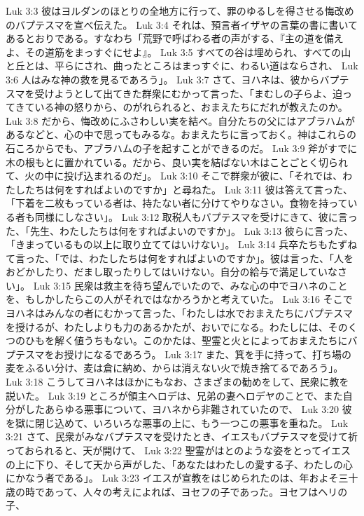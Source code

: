 Luk 3:3  彼はヨルダンのほとりの全地方に行って、罪のゆるしを得させる悔改めのバプテスマを宣べ伝えた。
Luk 3:4  それは、預言者イザヤの言葉の書に書いてあるとおりである。すなわち「荒野で呼ばわる者の声がする、『主の道を備えよ、その道筋をまっすぐにせよ』。
Luk 3:5  すべての谷は埋められ、すべての山と丘とは、平らにされ、曲ったところはまっすぐに、わるい道はならされ、
Luk 3:6  人はみな神の救を見るであろう」。
Luk 3:7  さて、ヨハネは、彼からバプテスマを受けようとして出てきた群衆にむかって言った、「まむしの子らよ、迫ってきている神の怒りから、のがれられると、おまえたちにだれが教えたのか。
Luk 3:8  だから、悔改めにふさわしい実を結べ。自分たちの父にはアブラハムがあるなどと、心の中で思ってもみるな。おまえたちに言っておく。神はこれらの石ころからでも、アブラハムの子を起すことができるのだ。
Luk 3:9  斧がすでに木の根もとに置かれている。だから、良い実を結ばない木はことごとく切られて、火の中に投げ込まれるのだ」。
Luk 3:10  そこで群衆が彼に、「それでは、わたしたちは何をすればよいのですか」と尋ねた。
Luk 3:11  彼は答えて言った、「下着を二枚もっている者は、持たない者に分けてやりなさい。食物を持っている者も同様にしなさい」。
Luk 3:12  取税人もバプテスマを受けにきて、彼に言った、「先生、わたしたちは何をすればよいのですか」。
Luk 3:13  彼らに言った、「きまっているもの以上に取り立ててはいけない」。
Luk 3:14  兵卒たちもたずねて言った、「では、わたしたちは何をすればよいのですか」。彼は言った、「人をおどかしたり、だまし取ったりしてはいけない。自分の給与で満足していなさい」。
Luk 3:15  民衆は救主を待ち望んでいたので、みな心の中でヨハネのことを、もしかしたらこの人がそれではなかろうかと考えていた。
Luk 3:16  そこでヨハネはみんなの者にむかって言った、「わたしは水でおまえたちにバプテスマを授けるが、わたしよりも力のあるかたが、おいでになる。わたしには、そのくつのひもを解く値うちもない。このかたは、聖霊と火とによっておまえたちにバプテスマをお授けになるであろう。
Luk 3:17  また、箕を手に持って、打ち場の麦をふるい分け、麦は倉に納め、からは消えない火で焼き捨てるであろう」。
Luk 3:18  こうしてヨハネはほかにもなお、さまざまの勧めをして、民衆に教を説いた。
Luk 3:19  ところが領主ヘロデは、兄弟の妻ヘロデヤのことで、また自分がしたあらゆる悪事について、ヨハネから非難されていたので、
Luk 3:20  彼を獄に閉じ込めて、いろいろな悪事の上に、もう一つこの悪事を重ねた。
Luk 3:21  さて、民衆がみなバプテスマを受けたとき、イエスもバプテスマを受けて祈っておられると、天が開けて、
Luk 3:22  聖霊がはとのような姿をとってイエスの上に下り、そして天から声がした、「あなたはわたしの愛する子、わたしの心にかなう者である」。
Luk 3:23  イエスが宣教をはじめられたのは、年およそ三十歳の時であって、人々の考えによれば、ヨセフの子であった。ヨセフはヘリの子、
